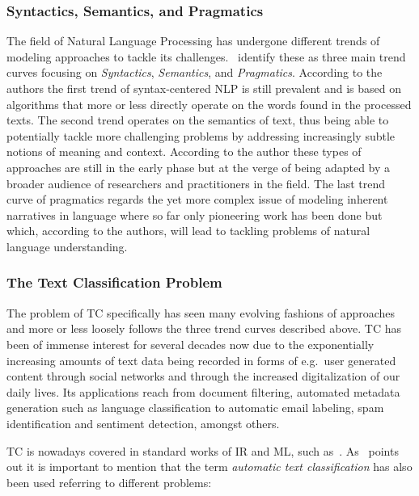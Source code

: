 \subsubsection*{Syntactics, Semantics, and Pragmatics}
\label{subs:Vogues in NLP: Syntactics, Semantics, and Pragmatics}

The field of Natural Language Processing has undergone different trends of modeling approaches to tackle its challenges.~\cite{Cambria:2014aa} identify these as three main trend curves focusing on \emph{Syntactics}, \emph{Semantics}, and \emph{Pragmatics}. According to the authors the first trend of syntax-centered NLP is still prevalent and is based on algorithms that more or less directly operate on the words found in the processed texts.
The second trend operates on the semantics of text, thus being able to potentially tackle more challenging problems by addressing increasingly subtle notions of meaning and context. According to the author these types of approaches are still in the early phase but at the verge of being adapted by a broader audience of researchers and practitioners in the field.
The last trend curve of pragmatics regards the yet more complex issue of modeling inherent narratives in language where so far only pioneering work has been done but which, according to the authors, will lead to tackling problems of natural language understanding.

\subsubsection*{The Text Classification Problem}
\label{subs:The Text Classification Problem}

The problem of \acrfull{TC} specifically has seen many evolving fashions of approaches and more or less loosely follows the three trend curves described above. \gls{TC} has been of immense interest for several decades now due to the exponentially increasing amounts of text data being recorded in forms of e.g.\ user generated content through social networks and through the increased digitalization of our daily lives. Its applications reach from document filtering, automated metadata generation such as language classification to automatic email labeling, spam identification and sentiment detection, amongst others.

\acrlong{TC} is nowadays covered in standard works of \acrlong{IR} and \acrlong{ML}, such as~\cite{Manning:2008aa}. As~\cite{Sebastiani:2002aa} points out it is important to mention that the term \emph{automatic text classification} has also been used referring to different problems: 

